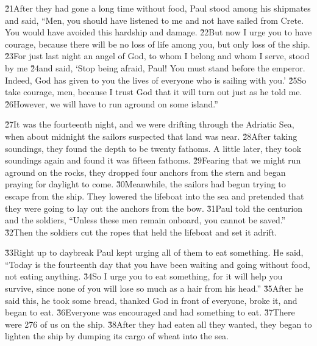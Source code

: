 \v{21}After they had gone a long time without food, Paul stood among his shipmates and said, ``Men, you should have listened to me and not have sailed from Crete. You would have avoided this hardship and damage. \v{22}But now I urge you to have courage, because there will be no loss of life among you, but only loss of the ship. \v{23}For just last night an angel of God, to whom I belong and whom I serve, stood by me \v{24}and said, `Stop being afraid, Paul! You must stand before the emperor. Indeed, God has given to you the lives of everyone who is sailing with you.' \v{25}So take courage, men, because I trust God that it will turn out just as he told me. \v{26}However, we will have to run aground on some island.''

\v{27}It was the fourteenth night, and we were drifting through the Adriatic Sea, when about midnight the sailors suspected that land was near. \v{28}After taking soundings, they found the depth to be twenty fathoms. A little later, they took soundings again and found it was fifteen fathoms. \v{29}Fearing that we might run aground on the rocks, they dropped four anchors from the stern and began praying for daylight to come. \v{30}Meanwhile, the sailors had begun trying to escape from the ship. They lowered the lifeboat into the sea and pretended that they were going to lay out the anchors from the bow. \v{31}Paul told the centurion and the soldiers, ``Unless these men remain onboard, you cannot be saved.'' \v{32}Then the soldiers cut the ropes that held the lifeboat and set it adrift.

\v{33}Right up to daybreak Paul kept urging all of them to eat something. He said, ``Today is the fourteenth day that you have been waiting and going without food, not eating anything. \v{34}So I urge you to eat something, for it will help you survive, since none of you will lose so much as a hair from his head.'' \v{35}After he said this, he took some bread, thanked God in front of everyone, broke it, and began to eat. \v{36}Everyone was encouraged and had something to eat. \v{37}There were 276 of us on the ship. \v{38}After they had eaten all they wanted, they began to lighten the ship by dumping its cargo of wheat into the sea.

